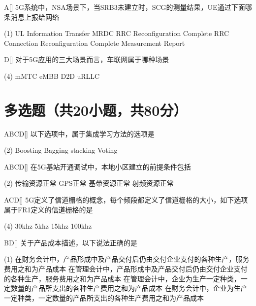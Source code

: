 \begin{choice}{A}[]
    5G系统中，NSA场景下，当SRB3未建立时，SCG的测量结果，UE通过下面哪条消息上报给网络
    \begin{tasks}(1)
        \task UL Information Transfer MRDC
        \task  RRC Reconfiguration Complete
        \task RRC Connection Reconfiguration Complete
        \task Measurement Report
    \end{tasks}
\end{choice}


\begin{choice}{D}[]
    对于5G应用的三大场景而言，车联网属于哪种场景
    \begin{tasks}(4)
        \task mMTC
        \task eMBB
        \task D2D
        \task uRLLC
    \end{tasks}
\end{choice}

\section{多选题（共20小题，共80分）}

\begin{choice}{\;ABCD\;}[]
    以下选项中，属于集成学习方法的选项是
    \begin{tasks}(2)
        \task Boosting
        \task Bagging
        \task stacking
        \task Voting
    \end{tasks}
\end{choice}

\begin{choice}{\;ABCD\;}[]
    在5G基站开通调试中，本地小区建立的前提条件包括
    \begin{tasks}(2)
        \task 传输资源正常
        \task GPS正常
        \task 基带资源正常
        \task 射频资源正常
    \end{tasks}
\end{choice}

\begin{choice}{\;ACD\;}[]
    5G定义了信道栅格的概念，每个频段都定义了信道栅格的大小，如下选项属于FR1定义的信道栅格的是
    \begin{tasks}(4)
        \task 30khz
        \task 5khz
        \task 15khz
        \task 100khz
    \end{tasks}
\end{choice}

\begin{choice}{\;BD\;}[]
    关于产品成本描述，以下说法正确的是
    \begin{tasks}(1)
        \task 在财务会计中，产品形成中及产品交付后仍由交付企业支付的各种生产，服务费用之和为产品成本
        \task 在管理会计中，产品形成中及产品交付后仍由交付企业支付的各种生产，服务费用之和为产品成本
        \task 在管理会计中，企业为生产一定种类，一定数量的产品所支出的各种生产费用之和为产品成本
        \task 在财务会计中，企业为生产一定种类，一定数量的产品所支出的各种生产费用之和为产品成本
    \end{tasks}
\end{choice}


